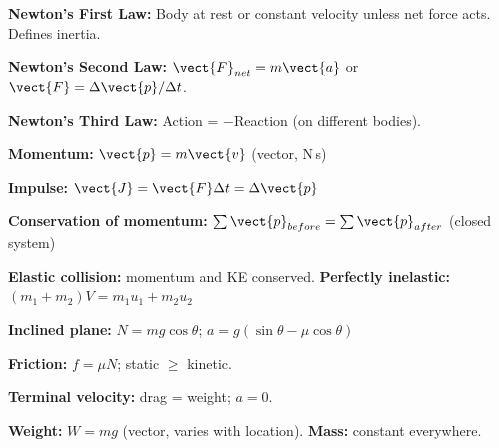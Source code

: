 \begin{summarybox}
\textbf{Newton's First Law:} Body at rest or constant
velocity unless net force acts. Defines inertia.

\textbf{Newton's Second Law:} $\vect{F}_{net} = m\vect{a}$
or $\vect{F} = \Delta\vect{p}/\Delta t$.

\textbf{Newton's Third Law:} Action = $-$Reaction
(on different bodies).

\textbf{Momentum:} $\vect{p} = m\vect{v}$ (vector, N\,s)

\textbf{Impulse:} $\vect{J} = \vect{F}\Delta t
= \Delta\vect{p}$

\textbf{Conservation of momentum:}
$\sum\vect{p}_{before} = \sum\vect{p}_{after}$
(closed system)

\textbf{Elastic collision:} momentum and KE conserved.
\textbf{Perfectly inelastic:}
$(m_1+m_2)V = m_1u_1+m_2u_2$

\textbf{Inclined plane:}
$N = mg\cos\theta$;
$a = g(\sin\theta - \mu\cos\theta)$

\textbf{Friction:} $f = \mu N$; static $\geq$ kinetic.

\textbf{Terminal velocity:} drag = weight; $a = 0$.

\textbf{Weight:} $W = mg$ (vector, varies with location).
\textbf{Mass:} constant everywhere.
\end{summarybox}

